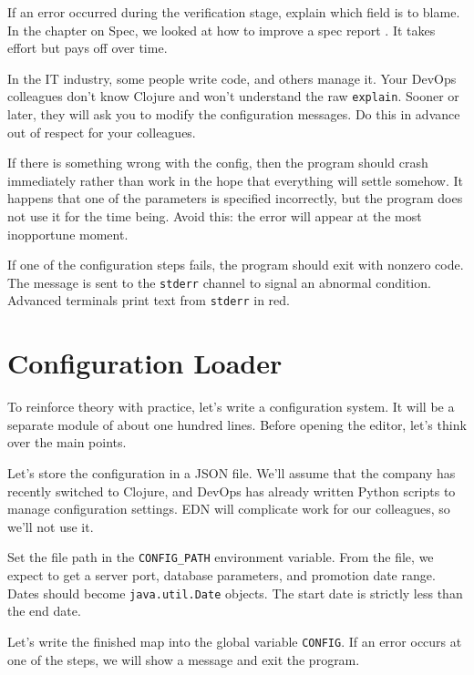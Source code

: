 If an error occurred during the verification stage, explain which field is to blame. In the chapter on Spec, we looked at how to improve a spec report . It takes effort but pays off over time.


In the IT industry, some people write code, and others manage it. Your DevOps colleagues don't know Clojure and won't understand the raw \verb|explain|.
Sooner or later, they will ask you to modify the configuration messages. Do this in advance out of respect for your colleagues.

If there is something wrong with the config, then the program should crash immediately rather than work in the hope that everything will settle somehow. It happens that one of the parameters is specified incorrectly, but the program does not use it for the time being. Avoid this: the error will appear at the most inopportune moment.


If one of the configuration steps fails, the program should exit with nonzero code. The message is sent to the \verb|stderr| channel to signal an abnormal condition. Advanced terminals print text from \verb|stderr| in red.

\section{Configuration Loader}


To reinforce theory with practice, let's write a configuration system. It will be a separate module of about one hundred lines. Before opening the editor, let's think over the main points.

Let's store the configuration in a JSON file. We'll assume that the company has recently switched to Clojure, and DevOps has already written Python scripts to manage configuration settings. EDN will complicate work for our colleagues, so we'll not use it.


Set the file path in the \verb|CONFIG_PATH| environment variable. From the file, we expect to get a server port, database parameters, and promotion date range. Dates should become \verb|java.util.Date| objects. The start date is strictly less than the end date.

Let's write the finished map into the global variable \verb|CONFIG|. If an error occurs at one of the steps, we will show a message and exit the program.

